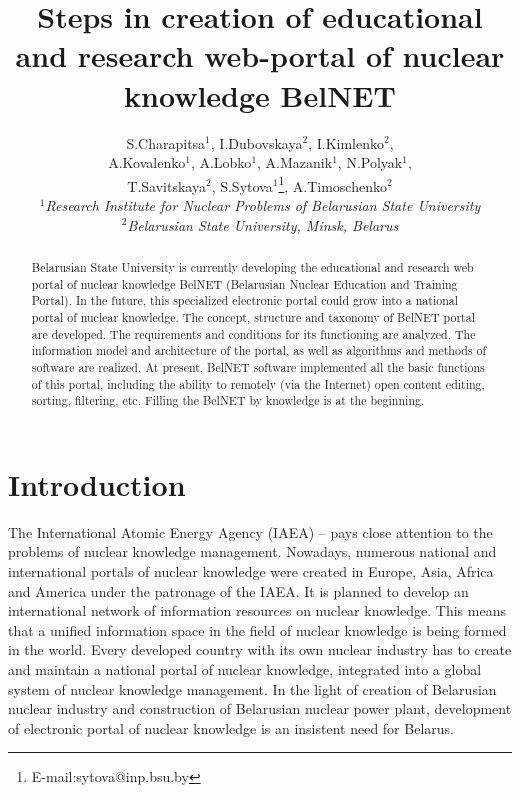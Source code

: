 \documentclass[12pt]{article}
\begin{document}
\title{Steps in creation of educational and research web-portal of nuclear knowledge BelNET}
\author{
S.Charapitsa{$^1$}, I.Dubovskaya{$^2$}, I.Kimlenko{$^2$}, \\
A.Kovalenko{$^1$}, A.Lobko{$^1$}, A.Mazanik{$^1$}, N.Polyak{$^1$}, \\
T.Savitskaya{$^2$}, S.Sytova{$^1$}\thanks{E-mail:sytova@inp.bsu.by}, A.Timoschenko{$^2$}\\
{\small \it {$^1$}Research Institute for Nuclear Problems of Belarusian State University}\\
{\small \it {$^2$}Belarusian State University, Minsk, Belarus}}
\date{}
\maketitle

\begin{abstract}
Belarusian State University is currently developing the
educational and research web portal of nuclear knowledge BelNET
(Belarusian Nuclear Education and Training Portal). In the future,
this specialized electronic portal could grow into a national
portal of nuclear knowledge. The concept, structure and taxonomy
of BelNET portal are developed. The requirements and conditions
for its functioning are analyzed. The information model and
architecture of the portal, as well as algorithms and methods of
software are realized. At present, BelNET software implemented all
the basic functions of this portal, including the ability to
remotely (via the Internet) open content editing, sorting,
filtering, etc. Filling the BelNET by knowledge is at the
beginning.
\end{abstract}

\section {Introduction}
The International Atomic Energy Agency (IAEA)
\cite{IAEA1}--\cite{IAEA4} pays close attention to the problems of
nuclear knowledge management. Nowadays, numerous national and
international portals of nuclear knowledge were created in Europe,
Asia, Africa and America under the patronage of the IAEA. It is
planned to develop an international network of information
resources on nuclear knowledge. This means that a unified
information space in the field of nuclear knowledge is being
formed in the world. Every developed country with its own nuclear
industry has to create and maintain a national portal of nuclear
knowledge, integrated into a global system of nuclear knowledge
management. In the light of creation of Belarusian nuclear
industry and construction of Belarusian nuclear power plant,
development of electronic portal of nuclear knowledge is an
insistent need for Belarus.
\end{document}
